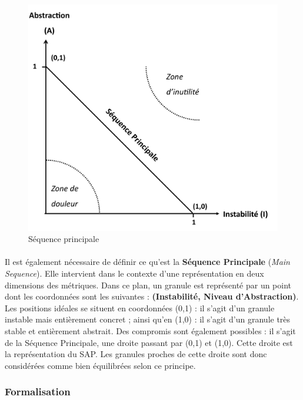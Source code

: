 \documentclass{scrartcl}
\begin{document}
\begin{figure}[ht!]
    \centering
    \includegraphics[scale=0.2]{img/MainSequence.png}
    \caption{Séquence principale}
\end{figure}

    \paragraph{}Il est également nécessaire de définir ce qu'est la \textbf{Séquence Principale} (\emph{Main Sequence}). Elle intervient dans le contexte d'une représentation en deux dimensions des métriques. Dans ce plan, un granule est représenté par un point dont les coordonnées sont les suivantes : \textbf{(Instabilité, Niveau d'Abstraction)}. Les positions idéales se situent en coordonnées (0,1) : il s'agit d'un granule instable mais entièrement concret ; ainsi qu'en (1,0) : il s'agit d'un granule très stable et entièrement abstrait. Des compromis sont également possibles : il s'agit de la Séquence Principale, une droite passant par (0,1) et (1,0). Cette droite est la représentation du SAP. Les granules proches de cette droite sont donc considérées comme bien équilibrées selon ce principe.
    


\subsubsection{Formalisation}
    \label{martin:formalisation}
\end{document}
